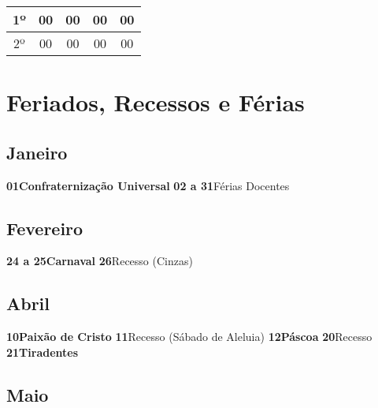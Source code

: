 \documentclass[thesis]{hmcposter}
\begin{document}
\begin{poster}
\begin{center}
\begin{table}
{\begin{tabular}{|c|c|c|c|c|}
1º & 00 & 00 & 00 & 00 \\ \hline
2º & 00 & 00 & 00 & 00 \\ \hline
\end{tabular}
}
\end{table}
\newline
\null
\newline
\end{center}
\vfill
\null
\newpage\onespacing \section{\color{hmcorange}Feriados, Recessos e Férias}\subsection{Janeiro}\textbf{01}\quad \quad \quad \quad \textbf{Confraternização Universal} \newline\textbf{02 a 31}\quad \quad Férias Docentes \newline\subsection{Fevereiro}\textbf{24 a 25}\quad \quad \textbf{Carnaval} \newline\textbf{26}\quad \quad \quad \quad Recesso (Cinzas) \newline\subsection{Abril}\textbf{10}\quad \quad \quad \quad \textbf{Paixão de Cristo} \newline\textbf{11}\quad \quad \quad \quad Recesso (Sábado de Aleluia) \newline\textbf{12}\quad \quad \quad \quad \textbf{Páscoa} \newline\textbf{20}\quad \quad \quad \quad Recesso \newline\textbf{21}\quad \quad \quad \quad \textbf{Tiradentes} \newline\subsection{Maio}
\end{poster}
\end{document}
